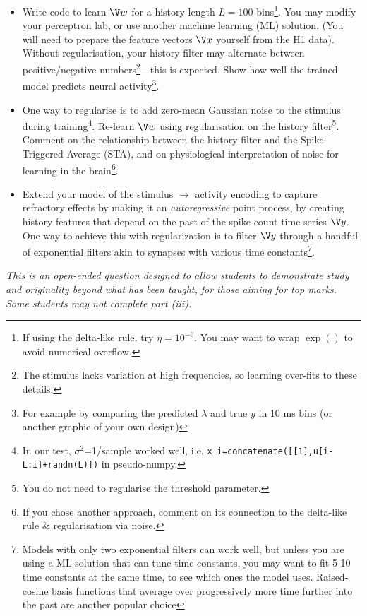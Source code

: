 \documentclass[11pt]{article}
\begin{document}
\begin{itemize}
\item[\textbf{(i)}] 
Write code to learn $\V w$ for a history length $L=100$ bins\footnote{If using the delta-like rule, try $\eta=10^{-6}$. You may want to wrap $\exp()$ to avoid numerical overflow.}. You may modify your perceptron lab, or use another machine learning (ML) solution. (You will need to prepare the feature vectors $\V x$ yourself from the H1 data).
Without regularisation, your history filter may alternate between positive/negative numbers\footnote{The stimulus lacks variation at high frequencies, so learning over-fits to these details.}---this is expected. Show how well the trained model predicts neural activity\footnote{For example by comparing the predicted $\lambda$ and true $y$ in 10 ms bins (or another graphic of your own design)}.
\item[\textbf{(ii)}] 
One way to regularise is to add zero-mean Gaussian noise to the stimulus during training\footnote{In our test, $\sigma^2$=1/sample worked well, i.e.
 \texttt{x\_i=concatenate([[1],u[i-L:i]+randn(L)])} in pseudo-numpy.}.
Re-learn $\V w$ using regularisation on the history filter\footnote{You do not need to regularise the threshold parameter.}. Comment on the relationship between the history filter and the Spike-Triggered Average (STA), and on physiological interpretation of noise for learning in the brain\footnote{If you chose another approach, comment on its  connection to the delta-like rule \& regularisation via noise.}.
\item[\textbf{(iii)}] Extend your model of the stimulus $\to$ activity encoding to capture refractory effects by making it an \textit{autoregressive} point process, by creating history features that depend on the past of the spike-count time series $\V y$. One way to achieve this with regularization is to filter $\V y$ through a handful of exponential filters akin to synapses with various time constants\footnote{Models with only two exponential filters can work well, but unless you are using a ML solution that can tune time constants, you may want to fit 5-10 time constants at the same time, to see which ones the model uses. Raised-cosine basis functions that average over progressively more time further into the past are another popular choice}.
\end{itemize}
\textit{This is an open-ended question designed to allow students to demonstrate study and originality beyond what has been taught, for those aiming for top marks. Some students may not complete part (iii). }
\end{document}
